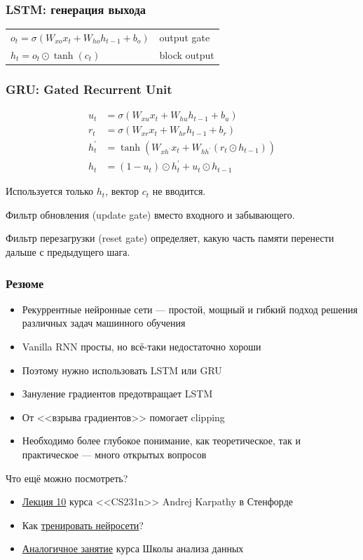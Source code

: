 \documentclass[fullscreen=true, bookmarks=true, hyperref={pdfencoding=unicode}]{beamer}
\begin{document}
\begin{frame}
  \frametitle{LSTM: генерация выхода}
  \begin{tabular}{ll}
    $ o_t = \sigma(W_{xo}x_t + W_{ho}h_{t-1} + b_{o})$ & output gate \\
    $ h_t = o_t \odot \tanh(c_t)$ & block output
  \end{tabular}
\end{frame}


\begin{frame}
  \frametitle{GRU: Gated Recurrent Unit}
  \begin{align*}
      u_t &= \sigma(W_{xu}x_t + W_{hu}h_{t-1} + b_{u}) \\
      r_t &= \sigma(W_{xr}x_t + W_{hr}h_{t-1} + b_{r}) \\
      h_t^\prime &= \tanh(W_{xh^\prime}x_t + W_{hh^\prime}(r_t\odot h_{t-1})) \\
      h_t &= (1-u_t) \odot h_t^\prime + u_t \odot h_{t-1}
  \end{align*}

  Используется только $h_t$, вектор $c_t$ не вводится.

  Фильтр обновления (update gate) вместо входного и забывающего.

  Фильтр перезагрузки (reset gate) определяет, какую часть памяти перенести дальше с предыдущего шага.
\end{frame}

\begin{frame}
  \frametitle{Резюме}
  \begin{itemize}
    \item Рекуррентные нейронные сети — простой, мощный и гибкий подход решения различных задач машинного обучения
    \item Vanilla RNN просты, но всё-таки недостаточно хороши
    \item Поэтому нужно использовать LSTM или GRU
    \item Зануление градиентов предотвращает LSTM
    \item От <<взрыва градиентов>> помогает clipping
    \item Необходимо более глубокое понимание, как теоретическое, так и практическое — много открытых вопросов
  \end{itemize}
  \pause
  Что ещё можно посмотреть?
  \begin{itemize}
    \item \href{https://www.youtube.com/watch?v=iX5V1WpxxkY}{Лекция 10} курса <<CS231n>> Andrej Karpathy в Стенфорде
    \item Как \href{http://karpathy.github.io/2019/04/25/recipe/}{тренировать нейросети}?
    \item \href{https://github.com/yandexdataschool/Practical_DL/tree/fall21/week06_rnn}{Аналогичное занятие} курса Школы анализа данных
  \end{itemize}
\end{frame}
\end{document}
